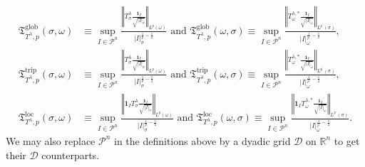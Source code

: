 \documentclass{amsart}%
\theoremstyle{plain}
\numberwithin{equation}{section}
\begin{document}
\begin{align*}
\mathfrak{T}_{T^{\lambda},p}^{\operatorname*{glob}}\left(  \sigma
,\omega\right)   &  \equiv\sup_{I\in\mathcal{P}^{n}}\frac{\left\Vert
T_{\sigma}^{\lambda}\frac{\mathbf{1}_{I}}{\sqrt{\left\vert I\right\vert
_{\sigma}}}\right\Vert _{L^{p}\left(  \omega\right)  }}{\left\vert
I\right\vert _{\sigma}^{\frac{1}{p}-\frac{1}{2}}}\text{ and }\mathfrak{T}%
_{T^{\lambda},p}^{\operatorname*{glob}}\left(  \omega,\sigma\right)
\equiv\sup_{I\in\mathcal{P}^{n}}\frac{\left\Vert T_{\omega}^{\lambda,\ast
}\frac{\mathbf{1}_{I}}{\sqrt{\left\vert I\right\vert _{\omega}}}\right\Vert
_{L^{p^{\prime}}\left(  \sigma\right)  }}{\left\vert I\right\vert _{\omega
}^{\frac{1}{p^{\prime}}-\frac{1}{2}}},\\
\mathfrak{T}_{T^{\lambda},p}^{\operatorname*{trip}}\left(  \sigma
,\omega\right)   &  \equiv\sup_{I\in\mathcal{P}^{n}}\frac{\left\Vert
T_{\sigma}^{\lambda}\frac{\mathbf{1}_{I}}{\sqrt{\left\vert I\right\vert
_{\sigma}}}\right\Vert _{L^{p}\left(  \omega\right)  }}{\left\vert
I\right\vert _{\sigma}^{\frac{1}{p}-\frac{1}{2}}}\text{ and }\mathfrak{T}%
_{T^{\lambda},p}^{\operatorname*{trip}}\left(  \omega,\sigma\right)
\equiv\sup_{I\in\mathcal{P}^{n}}\frac{\left\Vert T_{\omega}^{\lambda,\ast
}\frac{\mathbf{1}_{I}}{\sqrt{\left\vert I\right\vert _{\omega}}}\right\Vert
_{L^{p^{\prime}}\left(  \sigma\right)  }}{\left\vert I\right\vert _{\omega
}^{\frac{1}{p^{\prime}}-\frac{1}{2}}},\\
\mathfrak{T}_{T^{\lambda},p}^{\operatorname{loc}}\left(  \sigma,\omega\right)
&  \equiv\sup_{I\in\mathcal{P}^{n}}\frac{\left\Vert \mathbf{1}_{I}T_{\sigma
}^{\lambda}\frac{\mathbf{1}_{I}}{\sqrt{\left\vert I\right\vert _{\sigma}}%
}\right\Vert _{L^{p}\left(  \omega\right)  }}{\left\vert I\right\vert
_{\sigma}^{\frac{1}{p}-\frac{1}{2}}}\text{ and }\mathfrak{T}_{T^{\lambda}%
,p}^{\operatorname{loc}}\left(  \omega,\sigma\right)  \equiv\sup
_{I\in\mathcal{P}^{n}}\frac{\left\Vert \mathbf{1}_{I}T_{\omega}^{\lambda,\ast
}\frac{\mathbf{1}_{I}}{\sqrt{\left\vert I\right\vert _{\omega}}}\right\Vert
_{L^{p^{\prime}}\left(  \sigma\right)  }}{\left\vert I\right\vert _{\omega
}^{\frac{1}{p^{\prime}}-\frac{1}{2}}}.
\end{align*}
We may also replace $\mathcal{P}^{n}$ in the definitions above by a dyadic
grid $\mathcal{D}$ on $\mathbb{R}^{n}$ to get their $\mathcal{D}$ counterparts.
\end{document}
